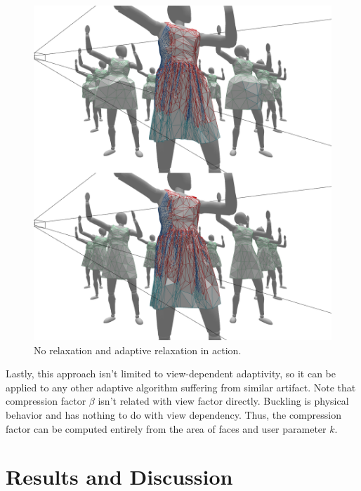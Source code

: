 \documentclass[10pt,journal,compsoc,twoside]{TexInputs/IEEEtran}
\begin{document}
\begin{figure}[t]
  \centering
  \includegraphics[width=1.0\columnwidth]{subelement_compression/no_vs_adaptive}
  \caption{No relaxation and adaptive relaxation in action.}
  \label{fig:no_vs_adaptive}
\end{figure}

Lastly, this approach isn't limited to view-dependent adaptivity, so it can be applied to
any other adaptive algorithm suffering from similar artifact.  Note that compression
factor $\beta$ isn't related with view factor directly. Buckling is physical behavior and
has nothing to do with view dependency. Thus, the compression factor can be computed
entirely from the area of faces and user parameter $k$.


\section{Results and Discussion}
\end{document}
